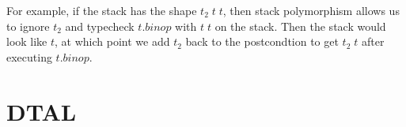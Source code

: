 For example, if the stack has the shape $t_2\; t\; t$, then stack polymorphism allows us to ignore $t_2$ and typecheck $t.binop$ with $t\;t$ on the stack.
Then the stack would look like $t$, at which point we add $t_2$ back to the postcondtion to get $t_2\; t$ after executing $t.binop$.


\section{DTAL}
